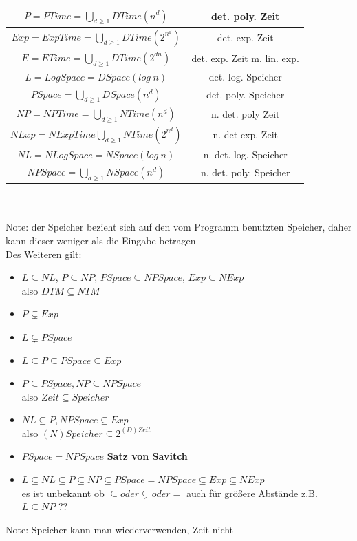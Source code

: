 \documentclass[12pt,a4paper]{article}
\begin{document}
\begin{tabular}{|c|c|}
\hline
$\displaystyle P = PTime = \bigcup_{d\geq 1}DTime(n^d)$ & det. poly. Zeit \\
\hline
$\displaystyle Exp = ExpTime = \bigcup_{d\geq 1}DTime(2^{n^d})$ & det. exp. Zeit \\
\hline
$\displaystyle E = ETime = \bigcup_{d\geq 1}DTime(2^{dn})$ & det. exp. Zeit m. lin. exp. \\
\hline
$\displaystyle L = LogSpace = DSpace(log\hspace{3pt}n)$ & det. log. Speicher \\
\hline
$\displaystyle PSpace = \bigcup_{d\geq 1}DSpace(n^d)$ & det. poly. Speicher \\
\hline
$\displaystyle NP = NPTime = \bigcup_{d\geq 1} NTime(n^d)$ & n. det. poly Zeit \\
\hline
$\displaystyle NExp = NExpTime \bigcup_{d\geq 1} NTime(2^{n^d})$ & n. det exp. Zeit \\
\hline
$\displaystyle NL = NLogSpace = NSpace(log\hspace{3pt}n)$ & n. det. log. Speicher \\
\hline
$\displaystyle NPSpace = \bigcup_{d\geq 1} NSpace(n^d)$ & n. det. poly. Speicher \\
\hline
\end{tabular}
\hfill \\
\hfill \\
Note: der Speicher bezieht sich auf den vom Programm benutzten Speicher, daher kann dieser weniger als die Eingabe betragen\\
Des Weiteren gilt:
\begin{itemize}
\item $L \subseteq NL$, $P \subseteq NP$, $PSpace \subseteq NPSpace$, $Exp \subseteq NExp$\\ also $DTM \subseteq NTM$
\item $P \subsetneq Exp$
\item $L \subsetneq PSpace$
\item $L \subseteq P \subseteq PSpace \subseteq Exp$
\item $P \subseteq PSpace, NP \subseteq NPSpace$\\ also $Zeit \subseteq Speicher$
\item $NL \subseteq P, NPSpace \subseteq Exp$\\ also $(N)Speicher \subseteq 2^{(D)Zeit}$
\item $PSpace = NPSpace$ \textbf{Satz von Savitch}
\item $L \subseteq NL \subseteq P \subseteq NP \subseteq PSpace = NPSpace \subseteq Exp \subseteq NExp$\\ es ist unbekannt ob $\subseteq oder \subsetneq oder = $ auch für größere Abstände z.B. $L \subseteq NP$ ??
\end{itemize}
Note: Speicher kann man wiederverwenden, Zeit nicht\\
\end{document}
